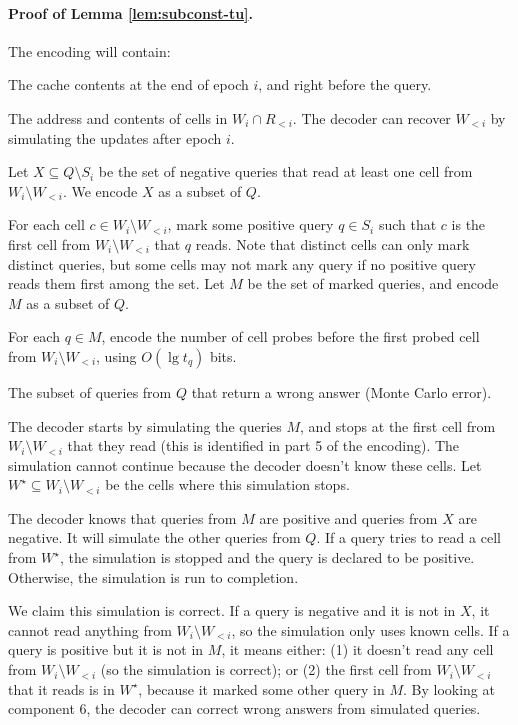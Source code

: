 \documentclass[letterpaper,11pt]{article}
\newenvironment{enumerate*}{\vspace{-1ex}\begin{enumerate}\setlength{\itemsep}{-0.5ex}\setlength{\parsep}{0pt}}{\end{enumerate}}
\begin{document}
\paragraph{Proof of Lemma \ref{lem:subconst-tu}.}
The encoding will contain:
\begin{enumerate*}
\item The cache contents at the end of epoch $i$, and right before the
  query.

\item The address and contents of cells in $W_i \cap R_{<i}$. The
  decoder can recover $W_{<i}$ by simulating the updates after epoch
  $i$.

\item Let $X\subseteq Q\setminus S_i$ be the set of negative queries
  that read at least one cell from $W_i \setminus W_{<i}$. We encode
  $X$ as a subset of $Q$. 

\item For each cell $c \in W_i \setminus W_{<i}$, mark some positive
  query $q\in S_i$ such that $c$ is the first cell from $W_i \setminus
  W_{<i}$ that $q$ reads. Note that distinct cells can only mark
  distinct queries, but some cells may not mark any query if no
  positive query reads them first among the set.  Let $M$ be the set
  of marked queries, and encode $M$ as a subset of $Q$.

\item For each $q\in M$, encode the number of cell probes before the
  first probed cell from $W_i \setminus W_{<i}$, using $O(\lg t_q)$
  bits.

\item The subset of queries from $Q$ that return a wrong answer (Monte
  Carlo error).
\end{enumerate*}

\noindent
The decoder starts by simulating the queries $M$, and stops at the
first cell from $W_i \setminus W_{<i}$ that they read (this is
identified in part 5 of the encoding). The simulation cannot continue
because the decoder doesn't know these cells. Let $W^\star \subseteq
W_i \setminus W_{<i}$ be the cells where this simulation stops.

The decoder knows that queries from $M$ are positive and queries from
$X$ are negative. It will simulate the other queries from $Q$. If a
query tries to read a cell from $W^\star$, the simulation is stopped
and the query is declared to be positive. Otherwise, the simulation is
run to completion.

We claim this simulation is correct. If a query is negative and it is
not in $X$, it cannot read anything from $W_i \setminus W_{<i}$, so
the simulation only uses known cells. If a query is positive but it is
not in $M$, it means either: (1) it doesn't read any cell from $W_i
\setminus W_{<i}$ (so the simulation is correct); or (2) the first
cell from $W_i \setminus W_{<i}$ that it reads is in $W^\star$,
because it marked some other query in $M$. By looking at component 6,
the decoder can correct wrong answers from simulated queries.
\end{document}
